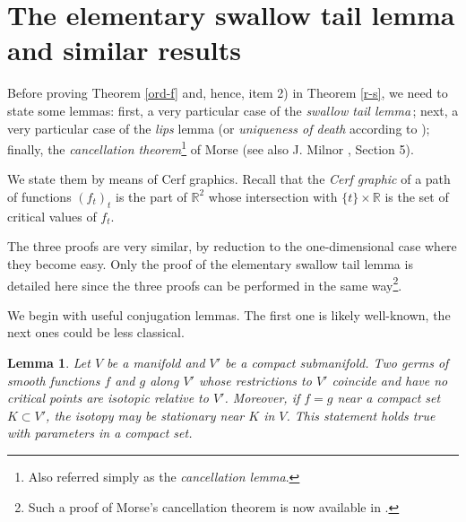 \documentclass[12pt]{amsart}
\newtheorem{lemme}[thm]{Lemma}
\def\R{\mathbb{R}}
\begin{document}
\section{The elementary swallow tail lemma and similar results} \label{s3} 

Before proving Theorem \ref{ord-f} and, hence, item 2) in Theorem \ref{r-s},
 we need to state %
 some lemmas:
  first, a very particular case  of  the {\it swallow tail lemma}\,;
  next,  a very particular case of the {\it lips} lemma (or
 {\it uniqueness of death} according to \cite{cerf});
 finally, the {\it cancellation theorem}\footnote{Also referred simply as the {\it cancellation lemma}.}
  of Morse \cite{morse}
(see also J. Milnor \cite{h-cob}, Section 5). 
  
 We state them 
 by means of Cerf graphics. Recall that the {\it Cerf graphic}
  of a path of functions $\left(f_t\right)_{t}$ is the part of $\R^2$
 whose intersection with $\{t\}\times \R$ is the set of critical values of $f_t$.
 
The three proofs are very similar, by reduction to the one-dimensional case 
where they become easy.
Only the proof of the elementary swallow tail lemma is detailed here since the three proofs can be performed 
in the same way\footnote{Such a proof of Morse's cancellation theorem is now available in \cite{cancellation}.}. %

We begin with  useful conjugation lemmas. The first one is likely well-known, the next ones could be 
less %
 classical.

\begin{lemme} \label{conjugation}
Let $V$ be a manifold and $V'$ be a compact submanifold. Two germs of smooth functions $f$ and $g$ 
along $V'$ whose restrictions  to $V'$ coincide and have no critical points are isotopic relative to $V'$. 
Moreover, if $f = g$ near a compact set $K \subset V'$, the isotopy may be stationary near $K$ in $V$.
  This statement holds true with parameters in a compact set.
\end{lemme}
\end{document}
